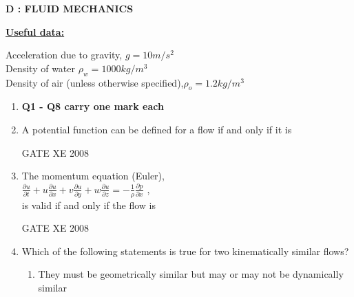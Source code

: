 \documentclass[12pt]{article}
\begin{document}
\newpage
\begin{center}
    \textbf{D : FLUID MECHANICS}
\end{center}

 \textbf{\underline{Useful data:}}
 \begin{center}
     Acceleration due to gravity, $g =10 m/s^{2}$\\
Density of water $\rho _{w} = 1000 kg/m^{3}$\\
Density of air (unless otherwise specified),$ \rho _{o}=1.2kg/m^{3}$
 \end{center}

\begin{enumerate}
\item[] \textbf{Q1 - Q8 carry one mark each}

\item A potential function can be defined for a flow if and only if it is

\begin{enumerate}
\end{enumerate}


GATE XE 2008
\item The momentum equation (Euler),\\
$\frac{\partial u}{\partial t}+ u \frac{\partial u}{\partial x}+v\frac{\partial u}{\partial y}+w\frac{\partial u}{\partial z} = -\frac{1}{\rho} \frac{\partial p}{\partial x}$ ,\\
is valid if and only if the flow is

\begin{enumerate}
\end{enumerate}

GATE XE 2008
\item Which of the following statements is true for two kinematically similar flows?

\begin{enumerate}
\item  They must be geometrically similar but may or may not be dynamically similar


\end{enumerate}
\end{enumerate}
\end{document}
